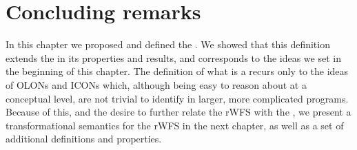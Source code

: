 
\section{Concluding remarks}

In this chapter we proposed and defined the \rwfs. We showed that this definition extends the \wfs in its properties and results, and corresponds to the ideas we set in the beginning of this chapter. The definition of what is a \rwfm recurs only to the ideas of OLONs and ICONs which, although being easy to reason about at a conceptual level, are not trivial to identify in larger, more complicated programs. Because of this, and the desire to further relate the rWFS with the \rsms, we present a transformational semantics for the rWFS in the next chapter, as well as a set of additional definitions and properties.

